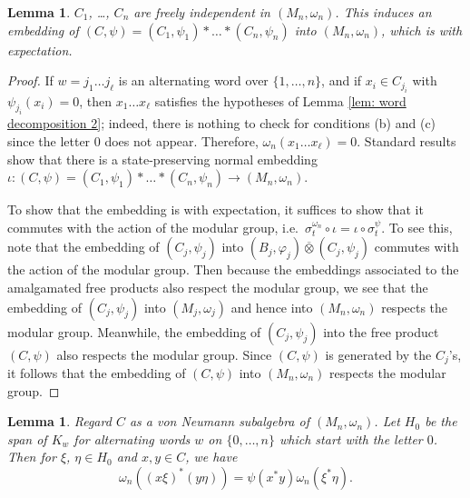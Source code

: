\documentclass[10pt]{amsart}
\numberwithin{equation}{section}
\newtheorem{lem}[thm]{Lemma}
\theoremstyle{definition}
\newcommand{\ootimes}{\mathbin{\overline{\otimes}}}
\begin{document}
\begin{lem} \label{lem: freeness of C}
$C_1$, \dots, $C_n$ are freely independent in $(M_n,\omega_n)$.  This induces an embedding of $(C,\psi) = (C_1,\psi_1) * \dots * (C_n,\psi_n)$ into $(M_n,\omega_n)$, which is with expectation.
\end{lem}

\begin{proof}
If $w = j_1 \dots j_\ell$ is an alternating word over $\{1,\dots,n\}$, and if $x_i \in C_{j_i}$ with $\psi_{j_i}(x_i) = 0$, then $x_1 \dots x_\ell$ satisfies the hypotheses of Lemma \ref{lem: word decomposition 2}; indeed, there is nothing to check for conditions (b) and (c) since the letter $0$ does not appear.  Therefore, $\omega_n(x_1 \dots x_\ell) = 0$.  Standard results show that there is a state-preserving normal embedding $\iota: (C,\psi) = (C_1, \psi_1) * \dots * (C_n,\psi_n) \to (M_n,\omega_n)$.

To show that the embedding is with expectation, it suffices to show that it commutes with the action of the modular group, i.e.\ $\sigma_t^{\omega_n} \circ \iota = \iota \circ \sigma_t^{\psi}$.  To see this, note that the embedding of $(C_j,\psi_j)$ into $(B_j,\varphi_j) \ootimes (C_j,\psi_j)$ commutes with the action of the modular group.  Then because the embeddings associated to the amalgamated free products also respect the modular group, we see that the embedding of $(C_j,\psi_j)$ into $(M_j,\omega_j)$ and hence into $(M_n,\omega_n)$ respects the modular group.  Meanwhile, the embedding of $(C_j,\psi_j)$ into the free product $(C,\psi)$ also respects the modular group.  Since $(C,\psi)$ is generated by the $C_j$'s, it follows that the embedding of $(C,\psi)$ into $(M_n,\omega_n)$ respects the modular group.
\end{proof}

\begin{lem} \label{lem: word decomposition 3}
Regard $C$ as a von Neumann subalgebra of $(M_n,\omega_n)$.  Let $H_0$ be the span of $K_w$ for alternating words $w$ on $\{0,\dots,n\}$ which start with the letter $0$.  Then for $\xi$, $\eta \in H_0$ and $x, y \in C$, we have
\begin{equation} \label{eq: inner product equality}
\omega_n((x\xi)^*(y\eta)) = \psi(x^*y) \omega_n(\xi^* \eta).
\end{equation}
\end{lem}
\end{document}
